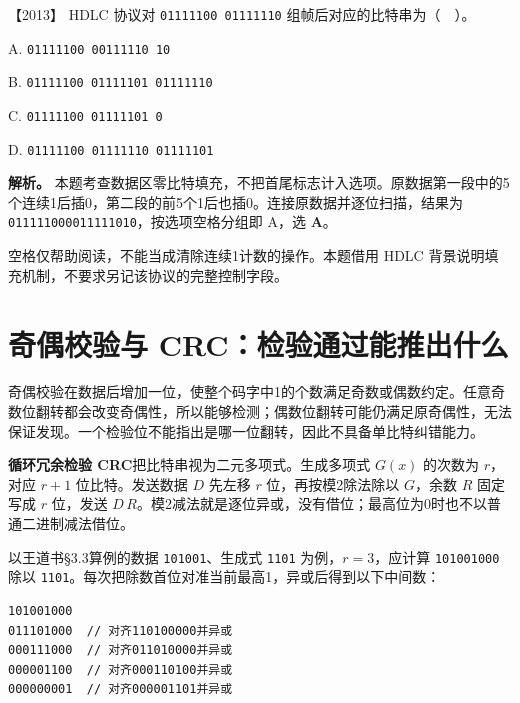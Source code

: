 \noindent{}【2013】 HDLC 协议对 \allowbreak{}\texttt{01111100\ 01111110} 组帧后对应的比特串为（　）。

A. \allowbreak{}\texttt{01111100\ 00111110\ 10}

B. \allowbreak{}\texttt{01111100\ 01111101\ 01111110}

C. \allowbreak{}\texttt{01111100\ 01111101\ 0}

D. \allowbreak{}\texttt{01111100\ 01111110\ 01111101}


\textbf{解析。} 本题考查数据区零比特填充，不把首尾标志计入选项。原数据第一段中的5个连续1后插0，第二段的前5个1后也插0。连接原数据并逐位扫描，结果为 \allowbreak{}\texttt{011111000011111010}，按选项空格分组即 A，选 \textbf{A}。

空格仅帮助阅读，不能当成清除连续1计数的操作。本题借用 HDLC 背景说明填充机制，不要求另记该协议的完整控制字段。

\section{奇偶校验与 CRC：检验通过能推出什么}\label{cn-03-03}

奇偶校验在数据后增加一位，使整个码字中1的个数满足奇数或偶数约定。任意奇数位翻转都会改变奇偶性，所以能够检测；偶数位翻转可能仍满足原奇偶性，无法保证发现。一个检验位不能指出是哪一位翻转，因此不具备单比特纠错能力。

\textbf{循环冗余检验 CRC}把比特串视为二元多项式。生成多项式 \(G(x)\) 的次数为 \(r\)，对应 \(r+1\) 位比特。发送数据 \(D\) 先左移 \(r\) 位，再按模2除法除以 \(G\)，余数 \(R\) 固定写成 \(r\) 位，发送 \(D\,R\)。模2减法就是逐位异或，没有借位；最高位为0时也不以普通二进制减法借位。

以王道书§3.3算例的数据 \allowbreak{}\texttt{101001}、生成式 \allowbreak{}\texttt{1101} 为例，\(r=3\)，应计算 \allowbreak{}\texttt{101001000} 除以 \allowbreak{}\texttt{1101}。每次把除数首位对准当前最高1，异或后得到以下中间数：

\par\medskip\noindent
\begin{minipage}{\linewidth}
\begin{verbatim}
101001000
011101000  // 对齐110100000并异或
000111000  // 对齐011010000并异或
000001100  // 对齐000110100并异或
000000001  // 对齐000001101并异或
\end{verbatim}
\end{minipage}\par\medskip

